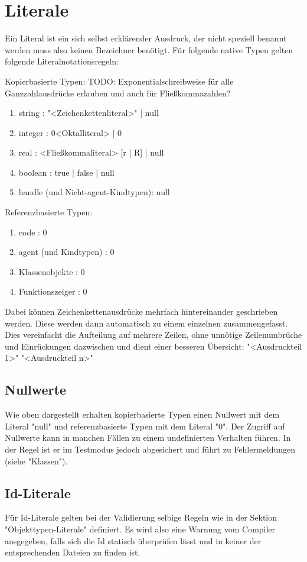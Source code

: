 \chapter{Literale}
Ein Literal ist ein sich selbst erklärender Ausdruck, der nicht speziell benannt werden muss also keinen Bezeichner benötigt.
Für folgende native Typen gelten folgende Literalnotationsregeln:

Kopierbasierte Typen:
TODO: Exponentialschreibweise für alle Ganzzahlausdrücke erlauben und auch für Fließkommazahlen?
\begin{enumerate}
\item string : "<Zeichenkettenliteral>" | null
\item integer : 0<Oktalliteral> | 0%
\item real : <Fließkommaliteral> [r | R] | null
\item boolean : true | false | null
\item handle (und Nicht-agent-Kindtypen): null
\end{enumerate}

Referenzbasierte Typen:
\begin{enumerate}
\item code : 0
\item agent (und Kindtypen) : 0
\item Klassenobjekte : 0
\item Funktionszeiger : 0
\end{enumerate}

Dabei können Zeichenkettenausdrücke mehrfach hintereinander geschrieben werden. Diese werden dann automatisch zu einem einzelnen
zusammengefasst. Dies vereinfacht die Aufteilung auf mehrere Zeilen, ohne unnötige Zeilenumbrüche und Einrückungen dazwischen und
dient einer besseren Übersicht:
"<Ausdruckteil 1>"
"<Ausdruckteil n>"

\section{Nullwerte}
Wie oben dargestellt erhalten kopierbasierte Typen einen Nullwert mit dem Literal "null" und referenzbasierte Typen mit dem Literal "0".
Der Zugriff auf Nullwerte kann in manchen Fällen zu einem undefinierten Verhalten führen.
In der Regel ist er im Testmodus jedoch abgesichert und führt zu Fehlermeldungen (siehe "Klassen").

\section{Id-Literale}
Für Id-Literale gelten bei der Validierung selbige Regeln wie in der Sektion "Objekttypen-Literale" definiert. Es wird also
eine Warnung vom Compiler ausgegeben, falls sich die Id statisch überprüfen lässt und in keiner der entsprechenden Dateien
zu finden ist.

